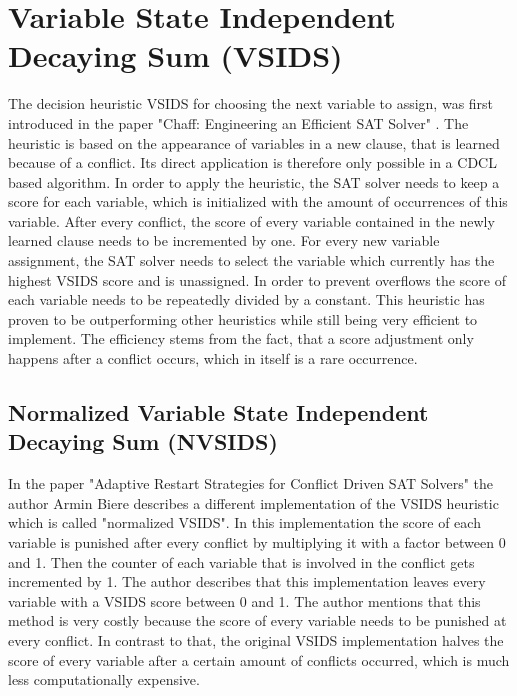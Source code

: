 \section{Variable State Independent Decaying Sum (VSIDS)}
\label{sec:VSIDS}

The decision heuristic VSIDS for choosing the next variable to assign, was first introduced in the paper "Chaff: Engineering an Efficient SAT Solver" \cite{moskewicz2001chaff}. The heuristic is based on the appearance of variables in a new clause, that is learned because of a conflict. Its direct application is therefore only possible in a CDCL based algorithm. In order to apply the heuristic, the SAT solver needs to keep a score for each variable, which is initialized with the amount of occurrences of this variable. After every conflict, the score of every variable contained in the newly learned clause needs to be incremented by one. For every new variable assignment, the SAT solver needs to select the variable which currently has the highest VSIDS score and is unassigned. In order to prevent overflows the score of each variable needs to be repeatedly divided by a constant. This heuristic has proven to be outperforming other heuristics while still being very efficient to implement. The efficiency stems from the fact, that a score adjustment only happens after a conflict occurs, which in itself is a rare occurrence.

\subsection{Normalized Variable State Independent Decaying Sum (NVSIDS)}
\label{sec:NVSIDS}

In the paper "Adaptive Restart Strategies for Conflict Driven SAT Solvers" \cite{biere2008adaptive} the author Armin Biere describes a different implementation of the VSIDS heuristic which is called "normalized VSIDS". In this implementation the score of each variable is punished after every conflict by multiplying it with a factor between 0 and 1. Then the counter of each variable that is involved in the conflict gets incremented by 1. The author describes that this implementation leaves every variable with a VSIDS score between 0 and 1. The author mentions that this method is very costly because the score of every variable needs to be punished at every conflict. In contrast to that, the original VSIDS implementation halves the score of every variable after a certain amount of conflicts occurred, which is much less computationally expensive.

